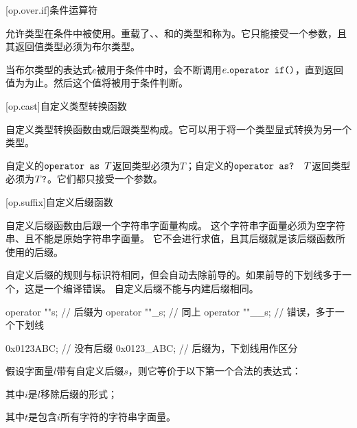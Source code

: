 [op.over.if]{条件运算符}

\pnum
{}允许类型在条件中被使用。重载了、、和的类型和称为。它只能接受一个参数，且其返回值类型必须为布尔类型。

\pnum
当布尔类型的表达式$e$被用于条件中时，会不断调用$e.\texttt{operator if()}$，直到返回值为为止。然后这个值将被用于条件判断。

[op.cast]{自定义类型转换函数}

\pnum
自定义类型转换函数由或后跟类型构成。它可以用于将一个类型显式转换为另一个类型。

\pnum
自定义的$\texttt{operator as }T$返回类型必须为$T$；自定义的$\texttt{operator as? }T$返回类型必须为$T\texttt{?}$。它们都只接受一个参数。

[op.suffix]{自定义后缀函数}

\pnum
自定义后缀函数由后跟一个字符串字面量构成。
这个字符串字面量必须为空字符串、且不能是原始字符串字面量。
它不会进行求值，且其后缀就是该后缀函数所使用的后缀。

\pnum
自定义后缀的规则与标识符相同，但会自动去除前导的\tcode{_}。如果前导的下划线多于一个，这是一个编译错误。
自定义后缀不能与内建后缀相同。

\enterexample
\begin{codeblock}
operator ""s; // 后缀为
operator ""_s; // 同上
operator ""__s; // 错误，多于一个下划线

0x0123ABC; // 没有后缀
0x0123_ABC; // 后缀为，下划线用作区分
\end{codeblock}
\exitexample

\pnum
假设字面量$l$带有自定义后缀$s$，则它等价于以下第一个合法的表达式：
\begin{codeblock}
    operator ""\{$s$}(\{$i$})
\end{codeblock}
其中$i$是$l$移除后缀的形式；
\begin{codeblock}
    operator ""\{$s$}(\{$t$})
\end{codeblock}
其中$t$是包含$i$所有字符的字符串字面量。